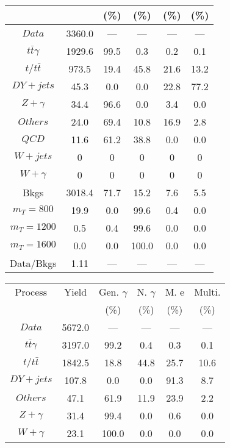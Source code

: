 \begin{figure}
\begin{minipage}[c]{0.32\textwidth}
{\begin{tabular}{cccccc}
 &  & (\%) & (\%) & (\%) & (\%)  \\
\hline
                                                                      $ Data $ &  3360.0 &  --- &  --- &  --- &  ---\\
$ t\bar{t}\gamma $ &  1929.6 &  99.5 &  0.3 &  0.2 &  0.1\\
$ t/t\bar{t} $ &  973.5 &  19.4 &  45.8 &  21.6 &  13.2\\
$ DY+jets $ &  45.3 &  0.0 &  0.0 &  22.8 &  77.2\\
$ Z+\gamma $ &  34.4 &  96.6 &  0.0 &  3.4 &  0.0\\
$ Others $ &  24.0 &  69.4 &  10.8 &  16.9 &  2.8\\
$ QCD $ &  11.6 &  61.2 &  38.8 &  0.0 &  0.0\\
$ W+jets $ &  0 &  0 &  0 &  0 &  0\\
$ W+\gamma $ &  0 &  0 &  0 &  0 &  0\\
Bkgs &  3018.4 &  71.7 &  15.2 &  7.6 &  5.5\\
$ m_{T} = 800 $ &  19.9 &  0.0 &  99.6 &  0.4 &  0.0\\
$ m_{T} = 1200 $ &  0.5 &  0.4 &  99.6 &  0.0 &  0.0\\
$ m_{T} = 1600 $ &  0.0 &  0.0 &  100.0 &  0.0 &  0.0\\
Data/Bkgs &  1.11 &  --- &  --- &  --- &  ---\\
\hline
\end{tabular}
}
\end{minipage}
\begin{minipage}[c]{0.32\textwidth}
\centering
\tiny{
\begin{tabular}{cccccc}
\hline
Process & Yield & Gen. $\gamma$ & N. $\gamma$ & M. e & Multi. \\
 &  & (\%) & (\%) & (\%) & (\%)  \\
\hline
                                                                      $ Data $ &  5672.0 &  --- &  --- &  --- &  ---\\
$ t\bar{t}\gamma $ &  3197.0 &  99.2 &  0.4 &  0.3 &  0.1\\
$ t/t\bar{t} $ &  1842.5 &  18.8 &  44.8 &  25.7 &  10.6\\
$ DY+jets $ &  107.8 &  0.0 &  0.0 &  91.3 &  8.7\\
$ Others $ &  47.1 &  61.9 &  11.9 &  23.9 &  2.2\\
$ Z+\gamma $ &  31.4 &  99.4 &  0.0 &  0.6 &  0.0\\
$ W+\gamma $ &  23.1 &  100.0 &  0.0 &  0.0 &  0.0\\

\end{tabular}}
\end{minipage}
\end{figure}
